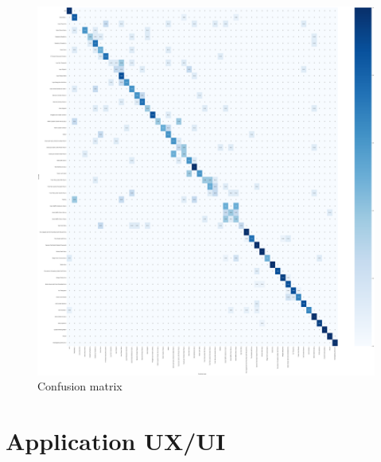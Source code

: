   \begin{figure}[h]
    \begin{center}
    
    \includegraphics[scale=0.1]{pic/model/blind_pic_4_ccm.png}
    \end{center}
    
    \caption[Confusion matrix]{Confusion matrix}
    \label{fig:Confusion matrix}
    \end{figure}




\newpage
\section{Application UX/UI}

   
    

